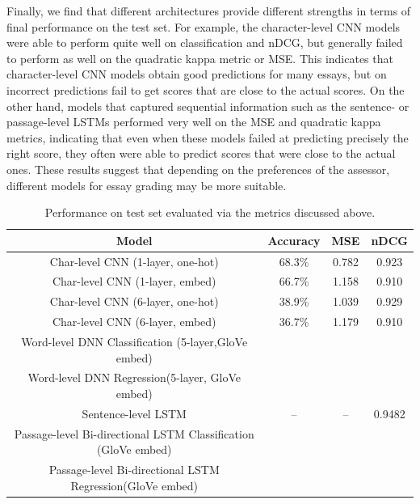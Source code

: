 \documentclass[10pt,psamsfonts]{amsart}
\theoremstyle{definition}
\theoremstyle{remark}
\numberwithin{equation}{section}
\begin{document}
Finally, we find that different architectures provide different strengths in terms of final performance on the test set. For example, the character-level CNN models were able to perform quite well on classification and nDCG, but generally failed to perform as well on the quadratic kappa metric or MSE. This indicates that character-level CNN models obtain good predictions for many essays, but on incorrect predictions fail to get scores that are close to the actual scores. On the other hand, models that captured sequential information such as the sentence- or passage-level LSTMs performed very well on the MSE and quadratic kappa metrics, indicating that even when these models failed at predicting precisely the right score, they often were able to predict scores that were close to the actual ones. These results suggest that depending on the preferences of the assessor, different models for essay grading may be more suitable.


\begin{table}
	\begin{tabular}{c|c|c|c}
		Model & Accuracy & MSE & nDCG  \\\hline
		Char-level CNN (1-layer, one-hot) & 68.3\% & 0.782 & 0.923 \\
		Char-level CNN (1-layer, embed) & 66.7\% & 1.158& 0.910\\
		Char-level CNN (6-layer, one-hot) & 38.9\% & 1.039 & 0.929 \\
		Char-level CNN (6-layer, embed) & 36.7\%& 1.179 & 0.910 \\
		Word-level DNN Classification (5-layer,GloVe embed) & & &  \\
		Word-level DNN Regression(5-layer, GloVe embed) & & &  \\
		Sentence-level LSTM & -- & -- & 0.9482 \\
		Passage-level Bi-directional LSTM Classification (GloVe embed) & & &  \\
		Passage-level Bi-directional LSTM Regression(GloVe embed) & & & 
		
	\end{tabular}
	\caption{Performance on test set evaluated via the metrics discussed above.}
	\label{fig:eval}
\end{table}
\end{document}
